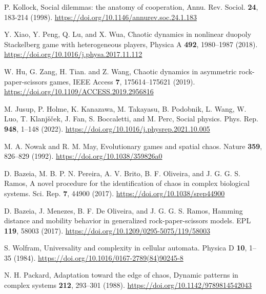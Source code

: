 \begin{thebibliography}{01}


P. Kollock, Social dilemmas: the anatomy of cooperation,
Annu. Rev. Sociol. \textbf{24}, 183-214 (1998).
\url{https://doi.org/10.1146/annurev.soc.24.1.183}


Y. Xiao, Y. Peng, Q. Lu, and X. Wua, Chaotic dynamics in nonlinear duopoly Stackelberg game with heterogeneous players,
Physica A \textbf{492}, 1980--1987 (2018).
\url{https://doi.org/10.1016/j.physa.2017.11.112}

W. Hu, G. Zang, H. Tian. and Z. Wang, Chaotic dynamics in asymmetric rock-paper-scissors games, IEEE Access \textbf{7}, 175614--175621 (2019).
\url{https://doi.org/10.1109/ACCESS.2019.2956816}

\raggedright
M. Jusup, P. Holme, K. Kanazawa,  M. Takayasu, B. Podobnik, L. Wang,  W. Luo, T. Klanjšček, J. Fan,  S. Boccaletti, and M. Perc,
Social physics.
Phys. Rep. \textbf{948}, 1--148 (2022). 
\url{https://doi.org/10.1016/j.physrep.2021.10.005}

\raggedright
M. A. Nowak and R. M. May,
Evolutionary games and spatial chaos. 
Nature \textbf{359}, 826--829 (1992).
\url{https://doi.org/10.1038/359826a0}



\raggedright
D. Bazeia, M. B. P. N. Pereira, A. V. Brito, B. F. Oliveira, and J. G. G. S. Ramos,
A novel procedure for the identification of chaos in complex biological systems.
Sci. Rep. \textbf{7}, 44900 (2017).
\url{https://doi.org/10.1038/srep44900}

\raggedright
D. Bazeia, J. Menezes, B. F. De Oliveira, and J. G. G. S. Ramos,
Hamming distance and mobility behavior in generalized rock-paper-scissors models.
EPL \textbf{119}, 58003 (2017).
\url{https://doi.org/10.1209/0295-5075/119/58003}



\raggedright
S. Wolfram,
Universality and complexity in cellular automata.
Physica D \textbf{10}, 1--35 (1984).
\url{https://doi.org/10.1016/0167-2789(84)90245-8}


N. H. Packard,
Adaptation toward the edge of chaos,
Dynamic patterns in complex systems \textbf{212}, 293--301
(1988).
\url{https://doi.org/10.1142/9789814542043}






\end{thebibliography}
